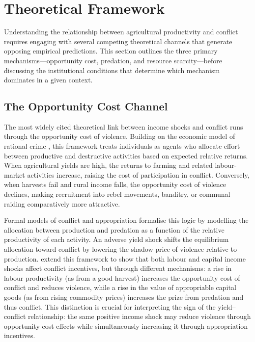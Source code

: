 \section{Theoretical Framework}
\label{sec:theory}

Understanding the relationship between agricultural productivity and conflict requires engaging with several competing theoretical channels that generate opposing empirical predictions. This section outlines the three primary mechanisms---opportunity cost, predation, and resource scarcity---before discussing the institutional conditions that determine which mechanism dominates in a given context.

\subsection{The Opportunity Cost Channel}

The most widely cited theoretical link between income shocks and conflict runs through the opportunity cost of violence. Building on the economic model of rational crime \citep{Becker1968}, this framework treats individuals as agents who allocate effort between productive and destructive activities based on expected relative returns. When agricultural yields are high, the returns to farming and related labour-market activities increase, raising the cost of participation in conflict. Conversely, when harvests fail and rural income falls, the opportunity cost of violence declines, making recruitment into rebel movements, banditry, or communal raiding comparatively more attractive.

Formal models of conflict and appropriation \citep{Grossman1991} formalise this logic by modelling the allocation between production and predation as a function of the relative productivity of each activity. An adverse yield shock shifts the equilibrium allocation toward conflict by lowering the shadow price of violence relative to production. \citet{DalBoDalBo2011} extend this framework to show that both labour and capital income shocks affect conflict incentives, but through different mechanisms: a rise in labour productivity (as from a good harvest) increases the opportunity cost of conflict and reduces violence, while a rise in the value of appropriable capital goods (as from rising commodity prices) increases the prize from predation and thus conflict. This distinction is crucial for interpreting the sign of the yield--conflict relationship: the same positive income shock may reduce violence through opportunity cost effects while simultaneously increasing it through appropriation incentives.

